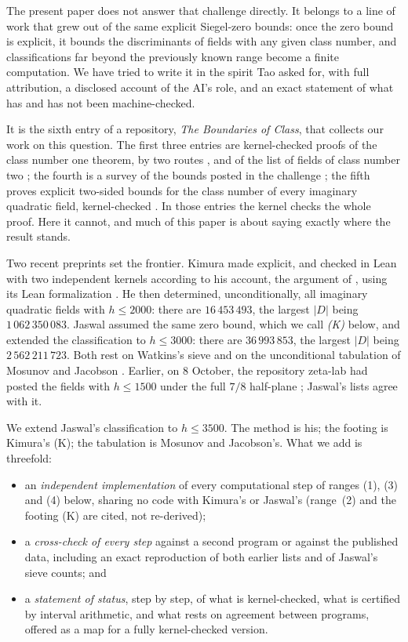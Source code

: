 \documentclass[11pt]{article}
\theoremstyle{definition}
\begin{document}
The present paper does not answer that challenge directly. It belongs to a line of work that grew out of the same
explicit Siegel-zero bounds: once the zero bound is explicit, it bounds the discriminants of fields with any given class
number, and classifications far beyond the previously known range become a finite computation. We have tried to write it
in the spirit Tao asked for, with full attribution, a disclosed account of the AI's role, and an exact statement of what
has and has not been machine-checked.

It is the sixth entry of a repository, \emph{The Boundaries of Class}, that collects our work on this question. The first
three entries are kernel-checked proofs of the class number one theorem, by two routes \cite{MurphyFirst,MurphyCN1}, and
of the list of fields of class number two \cite{MurphyHCN}; the fourth is a survey of the bounds posted in the challenge
\cite{MurphyComparison}; the fifth proves explicit two-sided bounds for the class number of every imaginary quadratic
field, kernel-checked \cite{MurphyBounds}. In those entries the kernel checks the whole proof. Here it cannot, and much of
this paper is about saying exactly where the result stands.

Two recent preprints set the frontier. Kimura \cite{Kimura2026} made explicit, and checked in Lean with two independent kernels
according to his account, the argument of \cite{OpenAISZ}, using its Lean formalization \cite{OpenAIRepo}. He then determined, unconditionally, all
imaginary quadratic fields with $h \le 2000$: there are $16\,453\,493$, the largest $|D|$ being $1\,062\,350\,083$.
Jaswal \cite{Jaswal2026} assumed the same zero bound, which we call \emph{(K)} below, and extended the classification to
$h \le 3000$: there are $36\,993\,853$, the largest $|D|$ being $2\,562\,211\,723$. Both rest on Watkins's sieve
\cite{Watkins2004} and on the unconditional tabulation of Mosunov and Jacobson \cite{MJ16}. Earlier, on 8 October, the repository zeta-lab
had posted the fields with $h \le 1500$ under the full $7/8$ half-plane \cite{ZetaLab2026}; Jaswal's lists agree with it.

We extend Jaswal's classification to $h \le 3500$. The method is his; the footing is Kimura's (K); the tabulation is
Mosunov and Jacobson's. What we add is threefold:
\begin{itemize}[nosep]
\item an \emph{independent implementation} of every computational step of ranges (1), (3) and (4) below, sharing no
code with Kimura's or Jaswal's (range~(2) and the footing (K) are cited, not re-derived);
\item a \emph{cross-check of every step} against a second program or against the published data, including an
exact reproduction of both earlier lists and of Jaswal's sieve counts; and
\item a \emph{statement of status}, step by step, of what is kernel-checked, what is certified by interval arithmetic, and what
rests on agreement between programs, offered as a map for a fully kernel-checked version.
\end{itemize}
\end{document}
